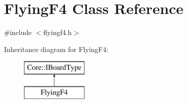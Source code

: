 \hypertarget{class_flying_f4}{\section{\-Flying\-F4 \-Class \-Reference}
\label{class_flying_f4}
}


{\ttfamily \#include $<$flyingf4.\-h$>$}

\-Inheritance diagram for \-Flying\-F4\-:\begin{figure}[H]
\begin{center}
\leavevmode
\includegraphics[height=2.000000cm]{class_flying_f4}
\end{center}
\end{figure}
